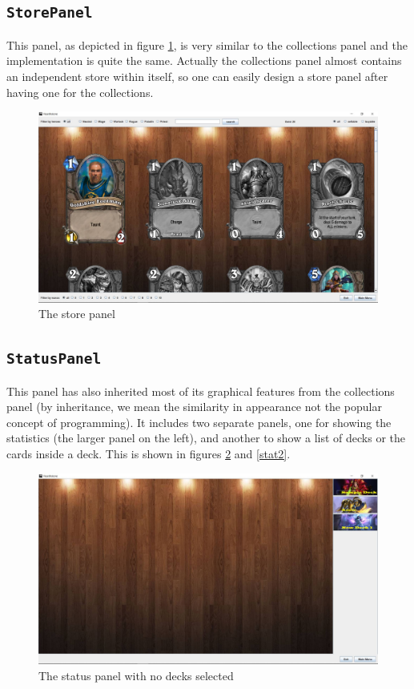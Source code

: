 \documentclass[a4paper]{article}
\begin{document}
\subsection{\texttt{StorePanel}}
This panel, as depicted in figure   \ref{store}, is very similar to the collections panel and the implementation is quite the same. Actually the collections panel almost contains an independent store within itself, so one can easily design a store panel after having one for the collections.

\begin{figure}[h!]
	\centering
	\includegraphics[scale=0.4]{StorePanel.JPG}
	\caption{The store panel}
	\label{store}
\end{figure}

\subsection{\texttt{StatusPanel}}
This panel has also inherited most of its graphical features from the collections panel (by inheritance, we mean the similarity in appearance not the popular concept of programming). It includes two separate panels, one for showing the statistics (the larger panel on the left), and another to show a list of decks or the cards inside a deck. This is shown in figures  \ref{stat1}  and \ref{stat2}.
\begin{figure}[h!]
	\centering
	\includegraphics[scale=0.4]{statusPanel1.JPG}
	\caption{The status panel with no decks selected}
	\label{stat1}
\end{figure}
\end{document}
